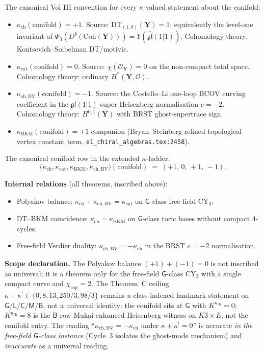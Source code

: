 \documentclass[11pt]{amsart}
\theoremstyle{definition}
\providecommand{\bY}{\mathbf{Y}}
\providecommand{\cO}{\mathcal{O}}
\providecommand{\fgl}{\mathfrak{gl}}
\providecommand{\Coh}{\mathrm{Coh}}
\begin{document}
The canonical Vol III convention for every $\kappa$-valued
statement about the conifold:
\begin{itemize}[leftmargin=2em]
\item $\kappa_{\mathrm{ch}}(\mathrm{conifold}) = +1$. Source:
  $\mathrm{DT}_{(1,0)}(\bY) = 1$; equivalently the level-one
  invariant of $\Phi_3(D^b(\Coh(\bY))) =
  Y(\widehat{\fgl}(1\vert 1))$. Cohomology theory:
  Kontsevich--Soibelman DT/motivic.
\item $\kappa_{\mathrm{cat}}(\mathrm{conifold}) = 0$. Source:
  $\chi(\cO_\bY) = 0$ on the non-compact total space. Cohomology
  theory: ordinary $H^*(\bY, \cO)$.
\item $\kappa_{\mathrm{ch,BV}}(\mathrm{conifold}) = -1$. Source:
  the Costello--Li one-loop BCOV curving coefficient in the
  $\mathfrak{gl}(1\vert 1)$-super Heisenberg normalisation
  $c = -2$. Cohomology theory: $H^{0,1}(\bY)$ with BRST
  ghost-supertrace sign.
\item $\kappa_{\mathrm{BKM}}(\mathrm{conifold}) = +1$ companion
  (Bryan--Steinberg refined topological vertex constant term,
  \texttt{e1\_chiral\_algebras.tex:2458}).
\end{itemize}
The canonical conifold row in the extended $\kappa$-ladder:
\[
 \bigl(\kappa_{\mathrm{ch}}, \kappa_{\mathrm{cat}},
  \kappa_{\mathrm{BKM}}, \kappa_{\mathrm{ch,BV}}\bigr)(\mathrm{conifold})
 \;=\; (+1,\, 0,\, +1,\, -1).
\]

\textbf{Internal relations} (all theorems, inscribed above):
\begin{itemize}[leftmargin=2em]
\item Polyakov balance: $\kappa_{\mathrm{ch}} +
  \kappa_{\mathrm{ch,BV}} = \kappa_{\mathrm{cat}}$ on $\mathsf G$-class
  free-field CY$_3$.
\item DT--BKM coincidence: $\kappa_{\mathrm{ch}} =
  \kappa_{\mathrm{BKM}}$ on $\mathsf G$-class toric bases without
  compact $4$-cycles.
\item Free-field Verdier duality: $\kappa_{\mathrm{ch,BV}} =
  -\kappa_{\mathrm{ch}}$ in the BRST $c = -2$ normalisation.
\end{itemize}

\textbf{Scope declaration.} The Polyakov balance $(+1) + (-1) = 0$
is not inscribed as universal; it is a theorem only for the
free-field $\mathsf G$-class CY$_3$ with a single compact curve
and $\chi_{\mathrm{top}} = 2$. The Theorem~C ceiling
$\kappa + \kappa^! \in \{0, 8, 13, 250/3, 98/3\}$ remains a
class-indexed landmark statement on $\mathsf{G/L/C/M/B}$, not a
universal identity: the conifold sits at $\mathsf G$ with
$K^{\kappa_{\mathrm{ch}}} = 0$; $K^{\kappa_{\mathrm{ch}}} = 8$ is
the $\mathsf B$-row Mukai-enhanced Heisenberg witness on
$K3 \times E$, not the conifold entry. The reading
``$\kappa_{\mathrm{ch,BV}} = -\kappa_{\mathrm{ch}}$ under
$\kappa + \kappa^! = 0$'' is accurate \emph{in the free-field
$\mathsf G$-class instance} (Cycle~3 isolates the ghost-mode
mechanism) and \emph{inaccurate} as a universal reading.
\end{document}
